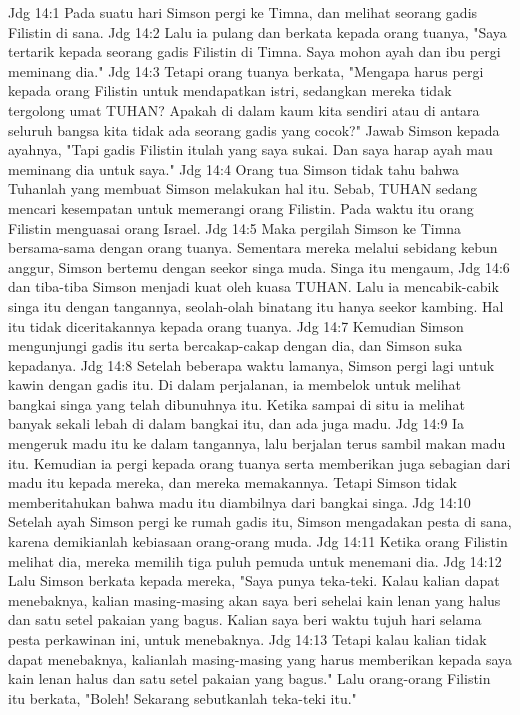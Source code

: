 Jdg 14:1  Pada suatu hari Simson pergi ke Timna, dan melihat seorang gadis Filistin di sana.
Jdg 14:2  Lalu ia pulang dan berkata kepada orang tuanya, "Saya tertarik kepada seorang gadis Filistin di Timna. Saya mohon ayah dan ibu pergi meminang dia."
Jdg 14:3  Tetapi orang tuanya berkata, "Mengapa harus pergi kepada orang Filistin untuk mendapatkan istri, sedangkan mereka tidak tergolong umat TUHAN? Apakah di dalam kaum kita sendiri atau di antara seluruh bangsa kita tidak ada seorang gadis yang cocok?" Jawab Simson kepada ayahnya, "Tapi gadis Filistin itulah yang saya sukai. Dan saya harap ayah mau meminang dia untuk saya."
Jdg 14:4  Orang tua Simson tidak tahu bahwa Tuhanlah yang membuat Simson melakukan hal itu. Sebab, TUHAN sedang mencari kesempatan untuk memerangi orang Filistin. Pada waktu itu orang Filistin menguasai orang Israel.
Jdg 14:5  Maka pergilah Simson ke Timna bersama-sama dengan orang tuanya. Sementara mereka melalui sebidang kebun anggur, Simson bertemu dengan seekor singa muda. Singa itu mengaum,
Jdg 14:6  dan tiba-tiba Simson menjadi kuat oleh kuasa TUHAN. Lalu ia mencabik-cabik singa itu dengan tangannya, seolah-olah binatang itu hanya seekor kambing. Hal itu tidak diceritakannya kepada orang tuanya.
Jdg 14:7  Kemudian Simson mengunjungi gadis itu serta bercakap-cakap dengan dia, dan Simson suka kepadanya.
Jdg 14:8  Setelah beberapa waktu lamanya, Simson pergi lagi untuk kawin dengan gadis itu. Di dalam perjalanan, ia membelok untuk melihat bangkai singa yang telah dibunuhnya itu. Ketika sampai di situ ia melihat banyak sekali lebah di dalam bangkai itu, dan ada juga madu.
Jdg 14:9  Ia mengeruk madu itu ke dalam tangannya, lalu berjalan terus sambil makan madu itu. Kemudian ia pergi kepada orang tuanya serta memberikan juga sebagian dari madu itu kepada mereka, dan mereka memakannya. Tetapi Simson tidak memberitahukan bahwa madu itu diambilnya dari bangkai singa.
Jdg 14:10  Setelah ayah Simson pergi ke rumah gadis itu, Simson mengadakan pesta di sana, karena demikianlah kebiasaan orang-orang muda.
Jdg 14:11  Ketika orang Filistin melihat dia, mereka memilih tiga puluh pemuda untuk menemani dia.
Jdg 14:12  Lalu Simson berkata kepada mereka, "Saya punya teka-teki. Kalau kalian dapat menebaknya, kalian masing-masing akan saya beri sehelai kain lenan yang halus dan satu setel pakaian yang bagus. Kalian saya beri waktu tujuh hari selama pesta perkawinan ini, untuk menebaknya.
Jdg 14:13  Tetapi kalau kalian tidak dapat menebaknya, kalianlah masing-masing yang harus memberikan kepada saya kain lenan halus dan satu setel pakaian yang bagus." Lalu orang-orang Filistin itu berkata, "Boleh! Sekarang sebutkanlah teka-teki itu."
